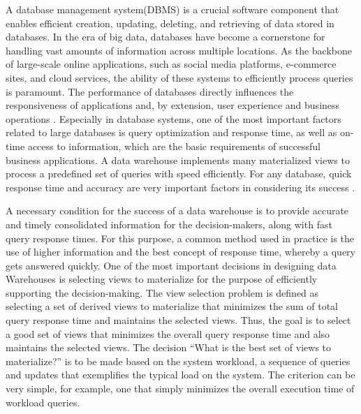 A database management system(DBMS) is a crucial software component that enables efficient creation, updating, deleting, and retrieving of data stored in databases. In the era of big data, databases have become a cornerstone for handling vast amounts of information across multiple locations. As the backbone of large-scale online applications, such as social media platforms, e-commerce sites, and cloud services, the ability of these systems to efficiently process queries is paramount. The performance of databases directly influences the responsiveness of applications and, by extension, user experience and business operations \cite{4}. Especially in database systems, one of the most important factors related to large databases is query optimization and response time, as well as on-time access to information, which are the basic requirements of successful business applications. A data warehouse implements many materialized views to process a predefined set of queries with speed efficiently. For any database, quick response time and accuracy are very important factors in considering its success \cite{karde2010selection}.\vspace{.4cm}

A necessary condition for the success of a data warehouse is to provide accurate and timely consolidated information for the decision-makers, along with fast query response times. For this purpose, a common method used in practice is the use of higher information and the best concept of response time, whereby a query gets answered quickly. One of the most important decisions in designing data Warehouses is selecting views to materialize for the purpose of efficiently supporting the decision-making. The view selection problem is defined as selecting a set of derived views to materialize that minimizes the sum of total query response time and maintains the selected views. Thus, the goal is to select a good set of views that minimizes the overall query response time and also maintains the selected views. The decision ``What is the best set of views to materialize?'' is to be made based on the system workload, a sequence of queries and updates that exemplifies the typical load on the system. The criterion can be very simple, for example, one that simply minimizes the overall execution time of workload queries.\vspace{.4cm}

